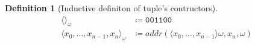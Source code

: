 \documentclass[10pt]{amsart}
\newcommand{\zero}{\mathtt{0}}
\newcommand{\one}{\mathtt{1}}
\newcommand{\vone}{x}
\newcommand{\vtwo}{y}
\newcommand{\oone}{\omega}
\newcommand{\pred}{pd}
\newcommand{\rv}{rv}
\newtheorem{defn}{Definition}
\begin{document}
\begin{defn}[Inductive definiton of tuple's contructors]
\begin{align*}
\langle\rangle_\oone &\coloneqq \zero\zero \one\one\zero\zero\\
\langle\vone_0, \ldots, \vone_{n-1}, \vone_n\rangle_\oone &\coloneqq addr(\langle\vone_0, \ldots, \vone_{n-1}\rangle \oone, \vone_n, \oone)
\end{align*}
\end{defn}
\begin{comment}
Successor:

\begin{align*}
S(\epsilon, \oone) &\coloneqq \one\\
S(y\zero, \oone)&\coloneqq y\one|_{y\one}\\
S(y\one, \oone)&\coloneqq S(y, \oone)\one|_{y\zero\zero}\\
\end{align*}

Chop:

\begin{align*}
cp(\epsilon, \omega) &\coloneqq \epsilon\\
cp(\vtwo \zero, \oone) &\coloneqq cp(\vtwo, \oone)|_{\vtwo}\\
cp(\vtwo \one, \oone) &\coloneqq \vtwo\one|_{\vtwo\one}\\\\
\end{align*}

Predecessor:

\begin{align*}
\pred'(\epsilon, \omega) &\coloneqq \epsilon\\
\pred'(\vtwo \zero, \oone) &\coloneqq \pred(\vtwo, \oone)\one|_{\zero}\quad(*)\\
\pred'(\vtwo \one, \oone) &\coloneqq \vtwo\zero|_{\vtwo}\\\\
\pred(\vtwo, \oone) &\coloneqq \rv(cp(\rv(\pred'(\vtwo, \oone))))
\end{align*}

Length:

\begin{align*}
\ln(\epsilon, \omega) &\coloneqq \overline 0\\
\ln(\vtwo \zero, \oone) &\coloneqq S(\ln(\vtwo, \oone))|_{\vtwo}\\
\ln(\vtwo \one, \oone) &\coloneqq S(\ln(\vtwo, \oone))|_{\vtwo}\\\\
\end{align*}


\end{comment}
\end{document}
